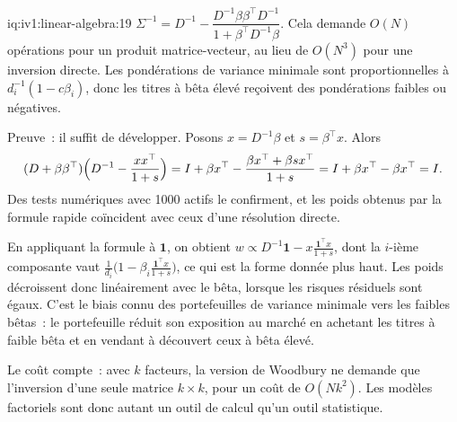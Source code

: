 \begin{solution}{iq:iv1:linear-algebra:19}
$\Sigma^{-1} = D^{-1} - \dfrac{D^{-1}\beta\beta^\top D^{-1}}{1 + \beta^\top D^{-1}\beta}$. Cela demande $O(N)$ opérations pour un produit matrice-vecteur, au lieu de $O(N^3)$ pour une inversion directe. Les pondérations de variance minimale sont proportionnelles à $d_i^{-1}(1 - c\beta_i)$, donc les titres à bêta élevé reçoivent des pondérations faibles ou négatives.

Preuve~: il suffit de développer. Posons $x = D^{-1}\beta$ et $s = \beta^\top x$. Alors
\[
(D + \beta\beta^\top)\Bigl(D^{-1} - \frac{xx^\top}{1 + s}\Bigr) = I + \beta x^\top - \frac{\beta x^\top + \beta s x^\top}{1 + s} = I + \beta x^\top - \beta x^\top = I.
\]
Des tests numériques avec 1000 actifs le confirment, et les poids obtenus par la formule rapide coïncident avec ceux d'une résolution directe.

En appliquant la formule à $\mathbf{1}$, on obtient $w \propto D^{-1}\mathbf{1} - x\frac{\mathbf{1}^\top x}{1 + s}$, dont la $i$-ième composante vaut $\frac{1}{d_i}\bigl(1 - \beta_i\frac{\mathbf{1}^\top x}{1 + s}\bigr)$, ce qui est la forme donnée plus haut. Les poids décroissent donc linéairement avec le bêta, lorsque les risques résiduels sont égaux. C'est le biais connu des portefeuilles de variance minimale vers les faibles bêtas~: le portefeuille réduit son exposition au marché en achetant les titres à faible bêta et en vendant à découvert ceux à bêta élevé.

Le coût compte~: avec $k$ facteurs, la version de Woodbury ne demande que l'inversion d'une seule matrice $k \times k$, pour un coût de $O(Nk^2)$. Les modèles factoriels sont donc autant un outil de calcul qu'un outil statistique.

\end{solution}

